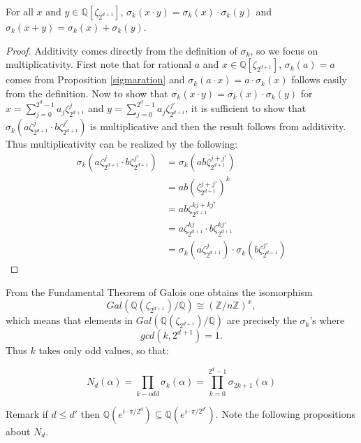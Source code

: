 \documentclass[12pt]{dalthesis}
\begin{document}
\begin{proposition}
For all $x$ and $y \in \mathbb{Q}[\zeta_{2^{d+1}}]$, $\sigma_k (x\cdot y) = \sigma_k(x) \cdot \sigma_k (y)$ and $\sigma_k (x + y) = \sigma_k(x) + \sigma_k (y)$.
\end{proposition}
\begin{proof}
Additivity comes directly from the definition of $\sigma_k$, so we focus on multiplicativity. First note that for rational $a$ and $x \in \mathbb{Q}[\zeta_{2^{d+1}}]$, $\sigma_k(a) = a$ comes from Proposition \ref{sigmaration} and $\sigma_k(a\cdot x) = a\cdot \sigma_k(x)$  follows easily from the definition. Now to show that $\sigma_k (x\cdot y) = \sigma_k (x) \cdot \sigma_k (y)$ for $x = \sum\limits_{j=0}^{2^d-1} a_j \zeta_{2^{d+1}}^j$ and $y = \sum\limits_{j=0}^{2^d-1} a_j \zeta_{2^{d+1}}^{j'}$, it is sufficient to show that $\sigma_k(a\zeta_{2^{d+1}}^{j} \cdot b\zeta_{2^{d+1}}^{j'})$ is multiplicative and then the result follows from additivity. Thus multiplicativity can be realized by the following:
\begin{equation}
\begin{split}
\sigma_k(a\zeta_{2^{d+1}}^{j} \cdot b\zeta_{2^{d+1}}^{j'}) & = \sigma_k(ab\zeta_{2^{d+1}}^{j+j'}) \\
& = ab (\zeta_{2^{d+1}}^{j+j'})^k \\
& = ab \zeta_{2^{d+1}}^{kj+kj'} \\
& = a \zeta_{2^{d+1}}^{kj} \cdot b\zeta_{2^{d+1}}^{kj'} \\
& = \sigma_k(a\zeta_{2^{d+1}}^{j}) \cdot \sigma_k( b\zeta_{2^{d+1}}^{j'})
\end{split}
\end{equation}
\end{proof}

From the Fundamental Theorem of Galois one obtains the isomorphism 
\[
Gal(\mathbb{Q}(\zeta_{2^{d+1}})/\mathbb{Q}) \cong (\mathbb{Z}/n\mathbb{Z})^x,
\]
which means that elements in $Gal(\mathbb{Q}(\zeta_{2^{d+1}})/\mathbb{Q})$ are precisely the $\sigma_k$'s where 
\[
gcd(k, 2^{d+1}) = 1.
\]
Thus $k$ takes only odd values, so that:

\begin{equation}
N_d(\alpha) = \prod_{k-odd} \sigma_k (\alpha) = \prod_{k=0}^{2^d - 1} \sigma_{2k+1} (\alpha)
\end{equation}

Remark if $d \leq d'$ then $\mathbb{Q}(e^{i\cdot \pi / 2^d}) \subseteq \mathbb{Q}(e^{i\cdot \pi / 2^{d'}})$. Note the following propositions about $N_d$.
\end{document}
